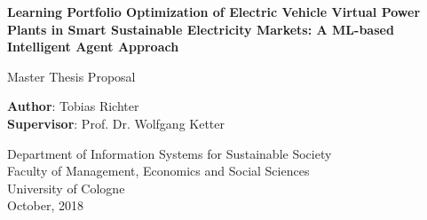 \begin{titlepage}
    \begin{center}
        \vspace*{1cm}

        \Large
        \textbf{Learning Portfolio Optimization of Electric Vehicle Virtual Power Plants in Smart Sustainable Electricity Markets: A ML-based Intelligent Agent Approach}

        \vspace{1.5cm}
        Master Thesis Proposal

        \vspace{7.0cm}

        \small
        \textbf{Author}: Tobias Richter\\
        \small
        \textbf{Supervisor}: Prof. Dr. Wolfgang Ketter

        \vspace{1cm}
        \small
        Department of Information Systems for Sustainable Society\\
        Faculty of Management, Economics and Social Sciences\\
        University of Cologne\\

        \vspace{1cm}
        October, 2018

    \end{center}
\end{titlepage}

